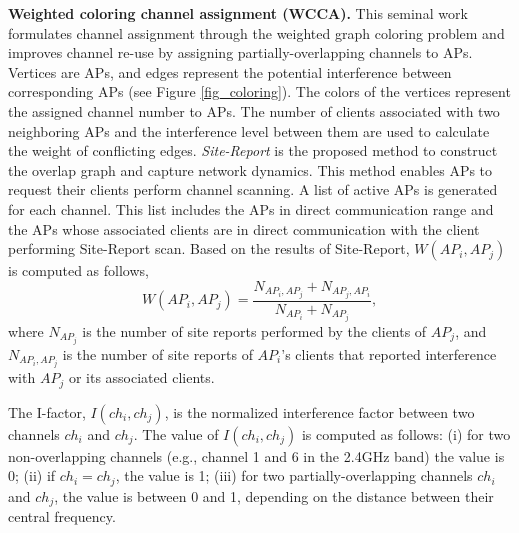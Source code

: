 \textbf{Weighted coloring channel assignment (WCCA).} 
\label{WCCA}
This seminal work \cite{Wcolor-2005} formulates channel assignment through the weighted graph coloring problem and improves channel re-use by assigning partially-overlapping channels to APs. 
Vertices are APs, and edges represent the potential interference between corresponding APs (see Figure \ref{fig_coloring}). 
The colors of the vertices represent the assigned channel number to APs. 
The number of clients associated with two neighboring APs and the interference level between them are used to calculate the weight of conflicting edges. 
\textit{Site-Report} is the proposed method to construct the overlap graph and capture network dynamics. %
This method enables APs to request their clients perform channel scanning. 
A list of active APs is generated for each channel.
This list includes the APs in direct communication range and the APs whose associated clients are in direct communication with the client performing Site-Report scan. 
Based on the results of Site-Report, $W(AP_{i},AP_{j})$ is computed as follows,
\begin{equation}
W(AP_{i},AP_{j})= \frac{N_{AP_{i},AP_{j}} + N_{AP_{j},AP_{i}}}{N_{AP_{i}}+N_{AP_{j}}},
\end{equation}
where $N_{AP_{j}}$ is the number of site reports performed by the clients of $AP_{j}$, and $N_{AP_{i}, AP_{j}}$ is the number of site reports of $AP_i$'s clients that reported interference with $AP_j$ or its associated clients. 

The I-factor, $I(ch_i,ch_j)$, is the normalized interference factor between two channels $ch_i$ and $ch_j$.
The value of $I(ch_i,ch_j)$ is computed as follows: 
(i) for two non-overlapping channels (e.g., channel 1 and 6 in the 2.4GHz band) the value is 0; 
(ii) if $ch_i=ch_j$, the value is 1; 
(iii) for two partially-overlapping channels $ch_i$ and $ch_j$, the value is between 0 and 1, depending on the distance between their central frequency.

